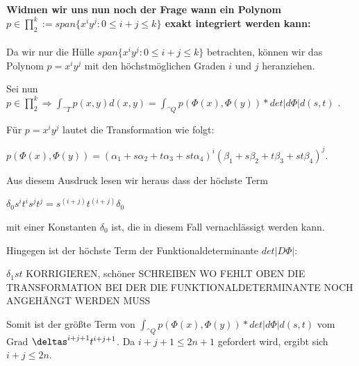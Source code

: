 \documentclass[a4paper,11pt,bibliography=totoc,listof=totoc,headinclude=true,cleardoublepage=empty,oneside]{scrbook}
\begin{document}
		
		
		 
		\begin{lstlisting} 
		
		
		\end{lstlisting}
		
		\color{change2}
		\textbf{Widmen wir uns nun noch der Frage wann ein Polynom $ p \in \prod_{2}^k:=span\{x^iy^j:0 \leq i+j\leq k \} $ exakt integriert werden kann:}
		\\ \\
		Da wir nur die Hülle $span\{x^iy^j:0 \leq i+j \leq k\}$ betrachten, können wir das Polynom $p=x^iy^j$ mit den höchstmöglichen Graden $i$ und $j$ heranziehen.
		
		Sei nun $ p \in \prod_{2}^k \Rightarrow \int_{\^{T}}^{} p(x,y)d(x,y) = 
		\int_{\^{Q}}^{} p(\Phi(x),\Phi(y)) * det|d\Phi| d(s,t)$ .
		
		Für $p=x^iy^j$ lautet die Transformation wie folgt:
		
		$p(\Phi(x),\Phi(y)) = (\alpha_1+s\alpha_2+t\alpha_3+st\alpha_4)^i(\beta_1+s\beta_2+t\beta_3+st\beta_4)^j$.
			
			Aus diesem Ausdruck lesen wir heraus dass der höchste Term 
			
			$\delta_0s^it^is^jt^j = s^{(i+j)}t^{(i+j)}\delta_0$
			
			mit einer Konstanten $\delta_0$ ist, die in diesem Fall vernachlässigt werden kann.
			
			Hingegen ist der höchste Term der Funktionaldeterminante $det|D\Phi|$:
			
			$\delta_1st$
			KORRIGIEREN, schöner SCHREIBEN
			WO FEHLT OBEN DIE TRANSFORMATION BEI DER DIE FUNKTIONALDETERMINANTE NOCH ANGEHÄNGT WERDEN MUSS
			
			Somit ist der größte Term von
			 $\int_{\^{Q}}^{} p(\Phi(x),\Phi(y)) * det|d\Phi| d(s,t)$ 
			 vom Grad
			 $\deltas^{i+j+1}t^{i+j+1}$.
			 Da $i+j+1\leq2n+1$ gefordert wird, ergibt sich $i+j\leq2n$.
			 			
			
		
\vspace{1cm}
		
\end{document}
